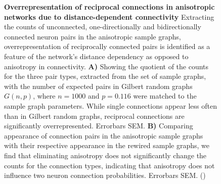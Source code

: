 \begin{figure}[ht]
  \centering
  \captionsetup{skip=10pt}
  \caption{\textbf{Overrepresentation of reciprocal connections in
      anisotropic networks due to distance-dependent connectivity}
    Extracting the counts of unconnected, one-directionally and
    bidirectionally connected neuron pairs in the anisotropic sample
    graphs, overrepresentation of reciprocally connected pairs is
    identified as a feature of the network's distance dependency as
    opposed to anisotropy in connectivity. \textbf{A)} Showing the
    quotient of the counts for the three pair types, extracted from the
    set of sample graphs, with the number of expected pairs in Gilbert
    random graphs $G(n,p)$, where $n=1000$ and $p=0.116$ were matched
    to the sample graph parameters. While single connections appear
    less often than in Gilbert random graphs, reciprocal connections
    are significantly overrepresented. Errorbars SEM. \textbf{B)}
    Comparing appearance of connection pairs in the anisotropic sample
    graphs with their respective appearance in the rewired sample
    graphs, we find that eliminating anisotropy does not significantly
    change the counts for the connection types, indicating that
    anisotropy does not influence two neuron connection
    probabilities. Errorbars SEM.  ()}
  \label{fig:two_neuron_probs}
\end{figure}  


